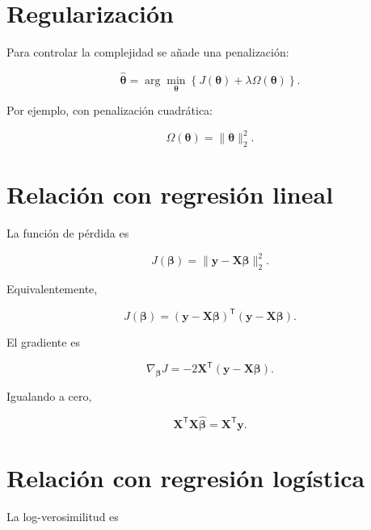\documentclass[
  spanish,
  10.5pt,
  letterpaper,
  DIV=11,
  numbers=noendperiod,
  oneside,
  open=any]{scrreprt}
\theoremstyle{definition}
\theoremstyle{definition}
\theoremstyle{plain}
\theoremstyle{remark}
\begin{document}
\section*{Regularización}\label{regularizaciuxf3n}


Para controlar la complejidad se añade una penalización:

\[
\widehat{\boldsymbol{\theta}}
=
\arg\min_{\boldsymbol{\theta}}
\left\{
J(\boldsymbol{\theta})
+
\lambda
\Omega(\boldsymbol{\theta})
\right\}.
\]

Por ejemplo, con penalización cuadrática:

\[
\Omega(\boldsymbol{\theta})
=
\|\boldsymbol{\theta}\|_2^2.
\]

\section*{Relación con regresión
lineal}\label{relaciuxf3n-con-regresiuxf3n-lineal-1}


La función de pérdida es

\[
J(\boldsymbol{\beta})
=
\|
\mathbf{y}
-
\mathbf{X}\boldsymbol{\beta}
\|_2^2.
\]

Equivalentemente,

\[
J(\boldsymbol{\beta})
=
(
\mathbf{y}
-
\mathbf{X}\boldsymbol{\beta}
)^{\mathsf T}
(
\mathbf{y}
-
\mathbf{X}\boldsymbol{\beta}
).
\]

El gradiente es

\[
\nabla_{\boldsymbol{\beta}}J
=
-2
\mathbf{X}^{\mathsf T}
(
\mathbf{y}
-
\mathbf{X}\boldsymbol{\beta}
).
\]

Igualando a cero,

\[
\mathbf{X}^{\mathsf T}
\mathbf{X}
\widehat{\boldsymbol{\beta}}
=
\mathbf{X}^{\mathsf T}
\mathbf{y}.
\]

\section*{Relación con regresión
logística}\label{relaciuxf3n-con-regresiuxf3n-loguxedstica-1}


La log-verosimilitud es
\end{document}
